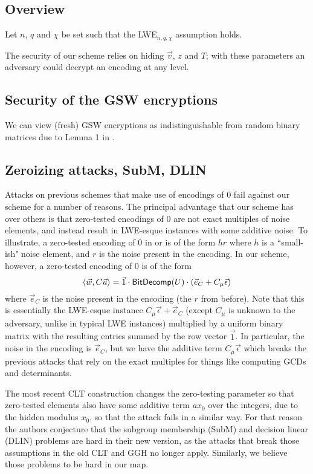 \subsection{Overview}

Let $n$, $q$ and $\chi$ be set such that the LWE$_{n,q,\chi}$ assumption holds. 

The security of our scheme relies on hiding $\vec{v}$, $z$ and $T$; with these parameters an adversary could decrypt an encoding at any level.

\subsection{Security of the GSW encryptions}   
We can view (fresh) GSW encryptions as indistinguishable from random binary matrices due to Lemma 1 in \cite{gsw}.

\subsection{Zeroizing attacks, SubM, DLIN}
Attacks on previous schemes \cite{chl,cgh,hj} that make use of encodings of 0 fail against our scheme for a number of reasons. The principal advantage that our scheme has over others is that zero-tested encodings of $0$ are not exact multiples of noise elements, and instead result in LWE-esque instances with some additive noise.  To illustrate, a zero-tested encoding of $0$ in \cite{clt} or \cite{ggh13a} is of the form $hr$ where $h$ is a ``small-ish" noise element, and $r$ is the noise present in the encoding.  In our scheme, however, a zero-tested encoding of $0$ is of the form
$$\left<\vec{w}, C \vec{u}\right> = \vec{1}\cdot \mathsf{BitDecomp}(U)\cdot (\vec{e}_C + C_\mu\vec{\epsilon})$$
where $\vec{e}_C$ is the noise present in the encoding (the $r$ from before).  Note that this is essentially the LWE-esque instance $C_\mu\vec{\epsilon} + \vec{e}_C$ (except $C_\mu$ is unknown to the adversary, unlike in typical LWE instances) multiplied by a uniform binary matrix with the resulting entries summed by the row vector $\vec{1}$.  In particular, the noise in the encoding is $\vec{e}_C$, but we have the additive term $C_\mu\vec{\epsilon}$ which breaks the previous attacks that rely on the exact multiples for things like computing GCDs and determinants. 

The most recent CLT construction \cite{clt15} changes the zero-testing parameter so that zero-tested elements also have some additive term $ax_0$ over the integers, due to the hidden modulus $x_0$, so that the attack fails in a similar way.  For that reason the authors conjecture that the subgroup membership (SubM) and decision linear (DLIN) problems are hard in their new version, as the attacks that break those assumptions in the old CLT and GGH no longer apply.  Similarly, we believe those problems to be hard in our map.

